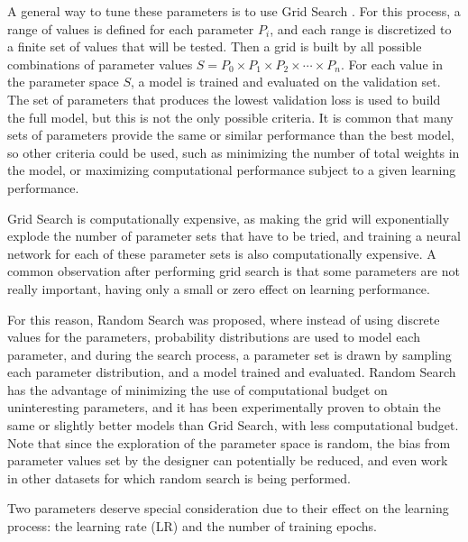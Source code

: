 A general way to tune these parameters is to use Grid Search . For this process, a range of values is defined for each parameter $P_i$, and each range is discretized to a finite set of values that will be tested. Then a grid is built by all possible combinations of parameter values $S = P_0 \times P_1 \times P_2 \times \cdots \times P_n$. For each value in the parameter space $S$, a model is trained and evaluated on the validation set. The set of parameters that produces the lowest validation loss is used to build the full model, but this is not the only possible criteria.
It is common that many sets of parameters provide the same or similar performance than the best model, so other criteria could be used, such as minimizing the number of total weights in the model, or maximizing computational performance subject to a given learning performance.

Grid Search is computationally expensive, as making the grid will exponentially explode the number of parameter sets that have to be tried, and training a neural network for each of these parameter sets is also computationally expensive. A common observation after performing grid search is that some parameters are not really important, having only a small or zero effect on learning performance.

For this reason, Random Search \cite{bergstra2012random} was proposed, where instead of using discrete values for the parameters, probability distributions are used to model each parameter, and during the search process, a parameter set is drawn by sampling each parameter distribution, and a model trained and evaluated.
Random Search has the advantage of minimizing the use of computational budget on uninteresting parameters, and it has been experimentally proven to obtain the same or slightly better models than Grid Search, with less computational budget. Note that since the exploration of the parameter space is random, the bias from parameter values set by the designer can potentially be reduced, and even work in other datasets for which random search is being performed.

Two parameters deserve special consideration due to their effect on the learning process: the learning rate (LR) and the number of training epochs.


